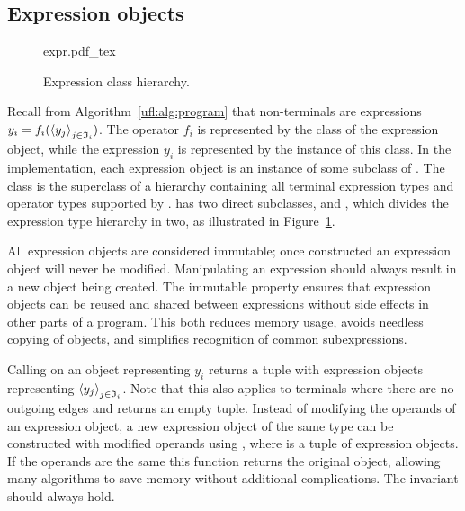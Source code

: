 \subsection{Expression objects}

\begin{figure}
\def\svgwidth{\largefig}
{expr.pdf_tex}
\caption{Expression class hierarchy.}
\label{ufl:fig:expr}
\end{figure}

Recall from Algorithm~\ref{ufl:alg:program} that non-terminals are
expressions $y_i = f_i(\left<y_j\right>_{j\in\mathfrak{I}_i})$.  The operator
$f_i$ is represented by the class of the expression object, while
the expression $y_i$ is represented by the instance of this class.
In the \ufl{} implementation, each expression object is an instance of
some subclass of . The class  is the superclass of
a hierarchy containing all terminal expression types and operator types
supported by \ufl{}.  has two direct subclasses, 
and , which divides the expression type hierarchy in two,
as illustrated in Figure~\ref{ufl:fig:expr}.

All expression objects are considered immutable; once constructed an
expression object will never be modified.  Manipulating an expression
should always result in a new object being created.  The immutable
property ensures that expression objects can be reused and shared
between expressions without side effects in other parts of a program.
This both reduces memory usage, avoids needless copying of objects,
and simplifies recognition of common subexpressions.

Calling  on an  object  representing
$y_i$ returns a tuple with expression objects representing
$\left<y_j\right>_{j\in\mathfrak{I}_i}$.  Note that this also applies to
terminals where there are no outgoing edges and 
returns an empty tuple.  Instead of modifying the operands of an
expression object, a new expression object of the same type can be
constructed with modified operands using ,
where  is a tuple of expression objects. If the operands
are the same this function returns the original object, allowing many
algorithms to save memory without additional complications. The invariant
 should always hold.


